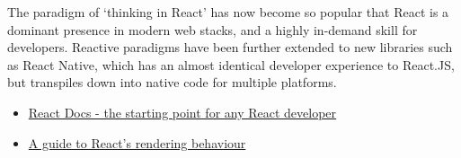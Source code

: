 The paradigm of `thinking in React' has now become so popular that React is a dominant presence in modern web stacks, and a highly in-demand skill for developers. Reactive paradigms have been further extended to new libraries such as React Native, which has an almost identical developer experience to React.JS, but transpiles down into native code for multiple platforms.

\begin{itemize}
    \item \href{https://reactjs.org/docs/hello-world.html}{React Docs - the starting point for any React developer}
    \item \href{https://blog.isquaredsoftware.com/2020/05/blogged-answers-a-mostly-complete-guide-to-react-rendering-behavior/#rendering-process-overview}{A guide to React's rendering behaviour}
\end{itemize}
